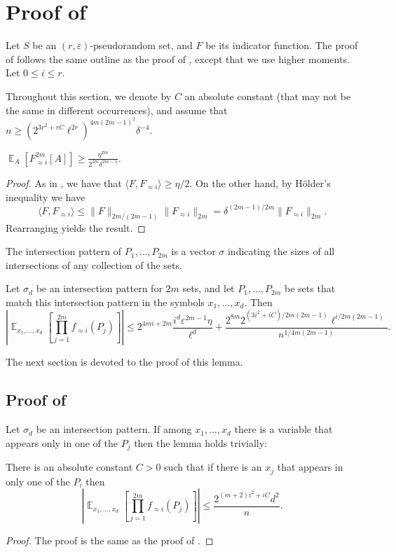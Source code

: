 \documentclass{toc}
\newcommand\card[1]{\left| {#1} \right|}
\newcommand\Expect[2]{{\mathop{\mathbb{E}}_{#1}\left[ {#2} \right]}}
\newcommand\norm[1]{\| #1 \|}
\newcommand\inner[2]{\langle{#1},{#2}\rangle}
\newcommand\eps{\varepsilon}
\renewcommand\geq{\geqslant}
\renewcommand\leq{\leqslant}
\newcommand\approxlvlfn[2]{{#1}_{\approx{#2}}}
\begin{document}
\section{Proof of }\label{section:imp}
Let $S$ be %
an  %
$(r,\eps)$-pseudorandom set, and $F$ be its indicator function.
The proof of  follows the same outline as the proof of , except that we use higher moments. Let $0\leq i\leq r$.

Throughout this section, we denote by $C$ an absolute constant (that may not be the same in different occurrences), and assume that
$n\geq (2^{3r^2+rC}\ell^{2r})^{4m(2m-1)^2}\delta^{-4}$.

\begin{claim}\label{claim:high_moment_lower}
$\Expect{A}{\approxlvlfn{F}{i}^{2m}[A]}\geq \frac{\eta^{2m}}{2^{2m}\delta^{2m-1}}$.
\end{claim}
\begin{proof}
As in , we have that $\inner{F}{\approxlvlfn{F}{i}}\geq \eta/2$. On the other hand, by H\"{o}lder's inequality we have
\[
\inner{F}{\approxlvlfn{F}{i}}
\leq \norm{F}_{2m/(2m-1)}\norm{\approxlvlfn{F}{i}}_{2m}
= \delta^{(2m-1)/2m}\norm{\approxlvlfn{F}{i}}_{2m}.
\]
Rearranging %
yields   %
the result.
\end{proof}

The intersection pattern of $P_1,\ldots,P_{2m}$ is a vector $\sigma$ indicating the sizes of
all intersections of any collection of the sets.


\begin{lemma}\label{lem:high_corr}
Let $\sigma_d$ be an intersection pattern for $2m$ sets, and let $P_1,\ldots,P_{2m}$ be sets that match this intersection pattern
in the symbols $x_1,\ldots,x_d$. Then
\begin{equation}\label{eq9}
\card{\Expect{x_1,\ldots,x_d}{\prod\limits_{j=1}^{2m}{\approxlvlfn{f}{i}(P_j)}}}
\leq 2^{4mi+2m} \frac{i^{d}\eps^{2m-1}\eta}{\ell^{d}}
+ \frac{2^{8m}2^{(3i^2+iC)/2m(2m-1)} \ell^{i/2m(2m-1)}}{n^{1/4m(2m-1)}}.
\end{equation}
\end{lemma}
The next section is devoted to the proof of this lemma.


\subsection{Proof of }
Let $\sigma_d$ be an intersection pattern. If among $x_1,\ldots, x_d$ there is a variable that appears only in one of the %
$P_j$   %
then the lemma holds trivially:
\begin{proposition}
There is an absolute constant $C>0$ %
such that if there is
an  %
$x_j$ that appears in only
one of the %
$P_i$ then  %
\[
\card{
\Expect{x_1,...,x_d}{
\prod\limits_{j=1}^{2m}{\approxlvlfn{f}{i}(P_j)}
}}\leq \frac{2^{(m+2)i^2 + iC}d^2}{n}.
\]
\end{proposition}
\begin{proof}
The proof is the same as the proof of .
\end{proof}
\end{document}
